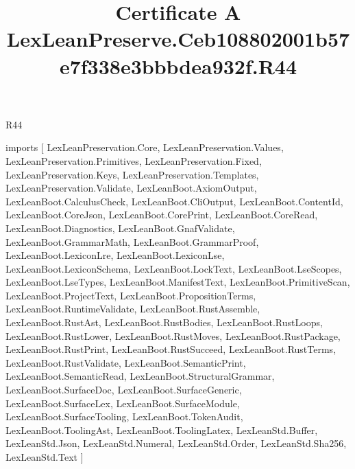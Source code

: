 \begin{lexlean}{R44}
\title{Certificate A LexLeanPreserve.Ceb108802001b57e7f338e3bbbdea932f.R44}
\begin{coremodule}
imports [
  LexLeanPreservation.Core,
  LexLeanPreservation.Values,
  LexLeanPreservation.Primitives,
  LexLeanPreservation.Fixed,
  LexLeanPreservation.Keys,
  LexLeanPreservation.Templates,
  LexLeanPreservation.Validate,
  LexLeanBoot.AxiomOutput,
  LexLeanBoot.CalculusCheck,
  LexLeanBoot.CliOutput,
  LexLeanBoot.ContentId,
  LexLeanBoot.CoreJson,
  LexLeanBoot.CorePrint,
  LexLeanBoot.CoreRead,
  LexLeanBoot.Diagnostics,
  LexLeanBoot.GnafValidate,
  LexLeanBoot.GrammarMath,
  LexLeanBoot.GrammarProof,
  LexLeanBoot.LexiconLre,
  LexLeanBoot.LexiconLse,
  LexLeanBoot.LexiconSchema,
  LexLeanBoot.LockText,
  LexLeanBoot.LseScopes,
  LexLeanBoot.LseTypes,
  LexLeanBoot.ManifestText,
  LexLeanBoot.PrimitiveScan,
  LexLeanBoot.ProjectText,
  LexLeanBoot.PropositionTerms,
  LexLeanBoot.RuntimeValidate,
  LexLeanBoot.RustAssemble,
  LexLeanBoot.RustAst,
  LexLeanBoot.RustBodies,
  LexLeanBoot.RustLoops,
  LexLeanBoot.RustLower,
  LexLeanBoot.RustMoves,
  LexLeanBoot.RustPackage,
  LexLeanBoot.RustPrint,
  LexLeanBoot.RustSucceed,
  LexLeanBoot.RustTerms,
  LexLeanBoot.RustValidate,
  LexLeanBoot.SemanticPrint,
  LexLeanBoot.SemanticRead,
  LexLeanBoot.StructuralGrammar,
  LexLeanBoot.SurfaceDoc,
  LexLeanBoot.SurfaceGeneric,
  LexLeanBoot.SurfaceLex,
  LexLeanBoot.SurfaceModule,
  LexLeanBoot.SurfaceTooling,
  LexLeanBoot.TokenAudit,
  LexLeanBoot.ToolingAst,
  LexLeanBoot.ToolingLatex,
  LexLeanStd.Buffer,
  LexLeanStd.Json,
  LexLeanStd.Numeral,
  LexLeanStd.Order,
  LexLeanStd.Sha256,
  LexLeanStd.Text
]


\end{coremodule}
\end{lexlean}
